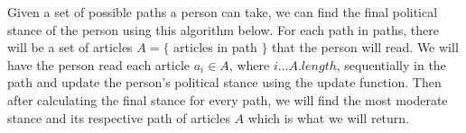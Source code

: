 \documentclass[11pt,reqno]{proc}
\begin{document}
Given a set of possible paths a person can take, we can find the final political stance of the person using this algorithm below. For each path in paths, there will be a set of articles $A = \{$ articles in path $\}$ that the person will read. We will have the person read each article $a_i \in A$, where $i...A.length$, sequentially in the path and update the person's political stance using the update function. Then after calculating the final stance for every path, we will find the most moderate stance and its respective path of articles $A$ which is what we will return. 

\vspace{6mm}
\end{document}
